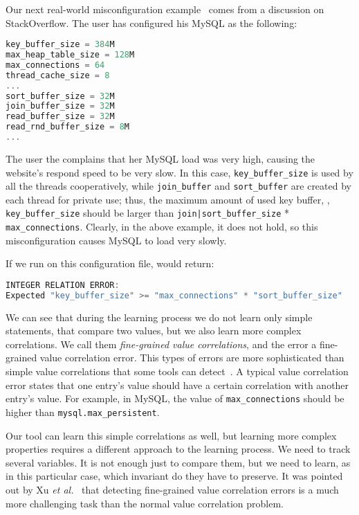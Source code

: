 Our next real-world misconfiguration example~\cite{correlation} comes from a discussion on StackOverflow.
The user has configured his MySQL as the following:

\begin{lstlisting}[language=C, xleftmargin=.01\textwidth]
key_buffer_size = 384M
max_heap_table_size = 128M
max_connections = 64
thread_cache_size = 8
...
sort_buffer_size = 32M
join_buffer_size = 32M
read_buffer_size = 32M
read_rnd_buffer_size = 8M
...
\end{lstlisting} 

The user the complains that her MySQL load was very high, causing the website's
respond speed to be very slow.
In this case, {\tt key\_buffer\_size} is used by all the threads
cooperatively, while {\tt join\_buffer} and {\tt sort\_buffer} are 
created by each thread for private use; thus, the maximum amount
of used key buffer, \ie, {\tt key\_buffer\_size} should be larger than 
{\tt join|sort\_buffer\_size} * {\tt max\_connections}. 
Clearly, in the above example, it does not hold, 
so this misconfiguration causes MySQL to load very slowly.

If we run \app on this configuration file, \app  would return:

\begin{lstlisting}[language=C, xleftmargin=.01\textwidth]
INTEGER RELATION ERROR:
Expected "key_buffer_size" >= "max_connections" * "sort_buffer_size"
\end{lstlisting} 

We can see that during the learning process we do not learn only simple statements, that compare two values, 
but we also learn more complex correlations. We call them {\em fine-grained value correlations}, and the error
a fine-grained value correlation
error. This types of errors are more sophisticated than simple value correlations that some tools can detect~\cite{yin11anempirical, zhang14encore}.
A typical value correlation error
states that one entry's value should have a certain correlation with
another entry's value. For example, in MySQL,
the value of {\tt max\_connections} should be higher than
{\tt mysql.max\_persistent}. 

Our tool can learn this simple correlations as well, but learning more complex properties requires a different 
approach to the learning 
process. We need to track several variables. It is not enough just to compare them, but we need to learn, as in this particular case, which
invariant do they have to preserve. It was pointed out by Xu {\em et al.}~\cite{xu15hey} that
detecting fine-grained value correlation errors 
is a much more challenging
task than the normal value correlation problem.

